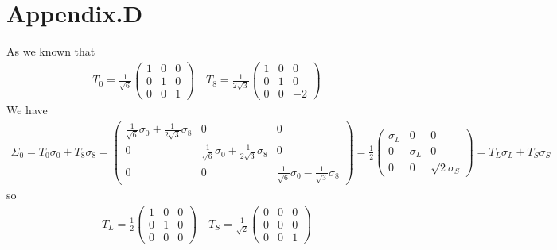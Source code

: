 \documentclass[12pt]{article}
\begin{document}
\section{Appendix.D}\label{appx_D}
As we known that
\begin{align}
T_0=\frac{1}{\sqrt{6}}
\begin{pmatrix}
1& 0 & 0\\
0 & 1 & 0 \\
0 & 0 & 1
\end{pmatrix} 
\quad
T_8=\frac{1}{2\sqrt{3}}
\begin{pmatrix}
1& 0 & 0\\
0 & 1 & 0 \\
0 & 0 & -2
\end{pmatrix} 
\end{align}
We have
\begin{align}
\Sigma_0=T_0 \sigma_0 +T_8 \sigma_8 
=\begin{pmatrix}
\frac{1}{\sqrt{6}}\sigma_0+\frac{1}{2\sqrt{3}}\sigma_8 & 0 & 0\\
0 & \frac{1}{\sqrt{6}}\sigma_0+\frac{1}{2\sqrt{3}}\sigma_8 & 0 \\
0 & 0 & \frac{1}{\sqrt{6}}\sigma_0-\frac{1}{\sqrt{3}}\sigma_8 
\end{pmatrix}
=\frac{1}{2}\begin{pmatrix}
\sigma_L & 0 & 0\\
0 & \sigma_L & 0 \\
0 & 0 & \sqrt{2} \sigma_S
\end{pmatrix}
=T_L \sigma_L +T_S \sigma_S
\end{align}
so 
\begin{align}
T_L=\frac{1}{2}
\begin{pmatrix}
1& 0 & 0\\
0 & 1 & 0 \\
0 & 0 & 0
\end{pmatrix} 
\quad
T_S=\frac{1}{\sqrt{2}}
\begin{pmatrix}
0& 0 & 0\\
0 & 0 & 0 \\
0 & 0 & 1
\end{pmatrix} 
\end{align}
\end{document}
